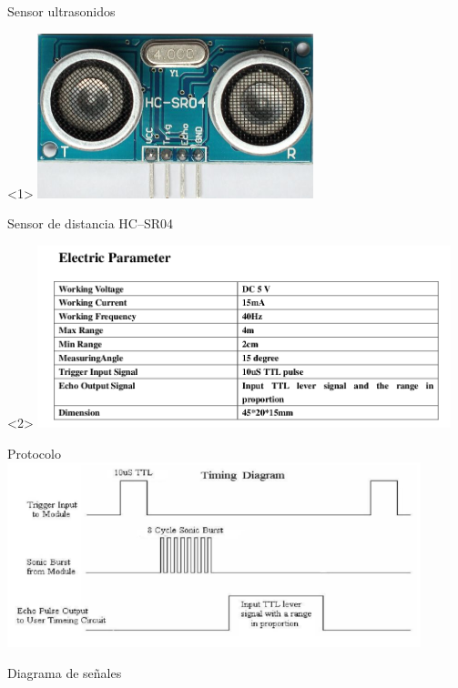 \begin{frame}{Sensor ultrasonidos}
  \begin{onlyenv}<1>
    \includegraphics [width=0.6\textwidth]{sr04.jpg}

    Sensor de distancia HC--SR04
  \end{onlyenv}
  \begin{onlyenv}<2>
    \includegraphics [width=0.9\textwidth]{sr04_tech.png}
  \end{onlyenv}

\end{frame}

\begin{frame}{Protocolo}
  \includegraphics [width=0.9\textwidth]{protocol.png}

  Diagrama de señales

\end{frame}

